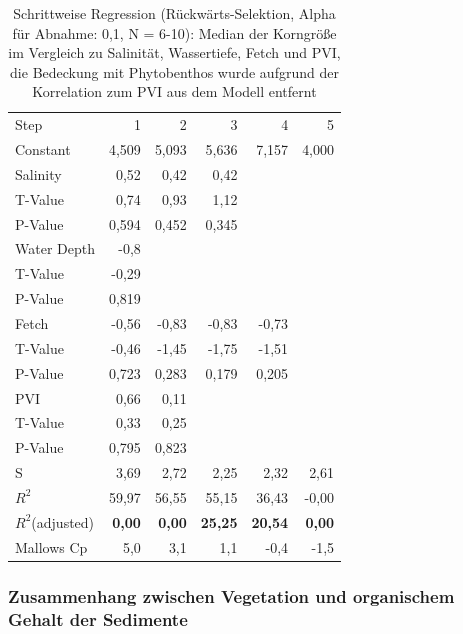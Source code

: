 \begin{table}[!htb]
\centering
\caption[Schrittweise Regression: Median der Korngröße im Vergleich zu 4 Prädikatoren]{Schrittweise Regression (Rückwärts-Selektion, Alpha für Abnahme: 0,1, N = 6-10): Median der Korngröße im Vergleich zu Salinität, Wassertiefe, Fetch und PVI, die Bedeckung mit Phytobenthos wurde aufgrund der Korrelation zum PVI aus dem Modell entfernt}
\begin{tabular}{lrrrrr}

\toprule

Step    &        1 &     2   &   3    &  4    &  5\\
Constant &   4,509 & 5,093 & 5,636 & 7,157 & 4,000\\
\midrule

Salinity       &   0,52 &  0,42  & 0,42\\
T-Value    &  0,74  & 0,93 &  1,12\\
P-Value   &  0,594 & 0,452 & 0,345\\
\midrule
Water Depth     &   -0,8\\
T-Value   &  -0,29\\
P-Value   &  0,819\\
\midrule
Fetch       &  -0,56 & -0,83 & -0,83 & -0,73\\
T-Value   &  -0,46 & -1,45 & -1,75 & -1,51\\
P-Value   &  0,723 & 0,283 & 0,179 & 0,205\\
\midrule
PVI          &  0,66  & 0,11\\
T-Value     &0,33  & 0,25\\
P-Value     &0,795 & 0,823\\
\midrule
\midrule
S           & 3,69  & 2,72 &  2,25 &  2,32  & 2,61\\
$R^2$        &59,97 & 56,55 & 55,15 & 36,43  & -0,00\\
$R^2$(adjusted)    &\textbf{0,00}  & \textbf{0,00} & \textbf{25,25} & \textbf{20,54}   & \textbf{0,00}\\
Mallows Cp    &5,0    &3,1  &  1,1 &  -0,4   &-1,5\\
\bottomrule

\end{tabular}
\label{tab:spearman_rank_correlations}
\end{table}




\subsubsection{Zusammenhang zwischen Vegetation und organischem Gehalt der Sedimente}

